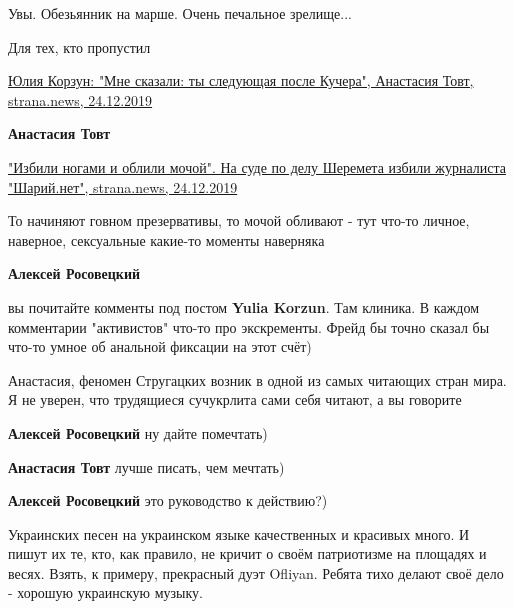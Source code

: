 \begin{itemize}
Увы. Обезьянник на марше. Очень печальное зрелище...

Для тех, кто пропустил

\href{https://strana.news/articles/reconstruction/241238-zhurnalistka-stranaua-julija-korzun-rasskazala-ob-uhrozakh-ot-radikalov.html}{%
Юлия Корзун: "Мне сказали: ты следующая после Кучера", %
Анастасия Товт, strana.news, 24.12.2019%
}

\begin{itemize} %
\textbf{Анастасия Товт} 

\href{https://strana.news/news/241166-izbili-nohami-i-oblili-mochoj-na-sude-po-delu-sheremeta-izbili-zhurnalista-sharijnet.html}{%
"Избили ногами и облили мочой".  На суде по делу Шеремета избили журналиста "Шарий.нет", strana.news, 24.12.2019%
}

\end{itemize} %


То начиняют говном презервативы, то мочой обливают - тут что-то личное,
наверное, сексуальные какие-то моменты наверняка

\textbf{Алексей Росовецкий} 

вы почитайте комменты под постом \textbf{Yulia Korzun}. Там клиника. В каждом комментарии
"активистов" что-то про экскременты. Фрейд бы точно сказал бы что-то умное об
анальной фиксации на этот счёт)


Анастасия, феномен Стругацких возник в одной из самых читающих стран мира. Я не
уверен, что трудящиеся сучукрлита сами себя читают, а вы говорите

\begin{itemize} %
\textbf{Алексей Росовецкий} ну дайте помечтать)

\textbf{Анастасия Товт} лучше писать, чем мечтать)

\textbf{Алексей Росовецкий} это руководство к действию?)
\end{itemize} %


Украинских песен на украинском языке качественных и красивых много. И пишут их
те, кто, как правило, не кричит о своём патриотизме на площадях и весях. Взять,
к примеру, прекрасный дуэт Ofliyan. Ребята тихо делают своё дело - хорошую
украинскую музыку.


\end{itemize}
